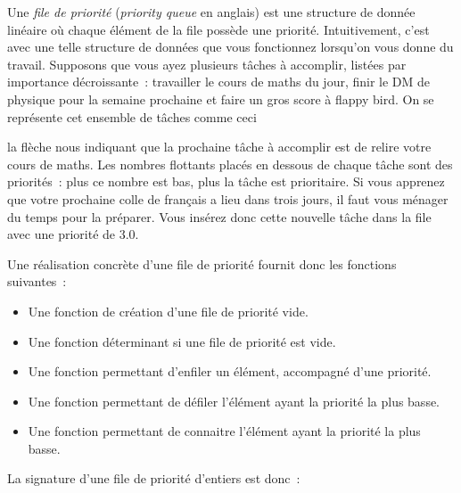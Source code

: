 \documentclass{magnolia}
\begin{document}
Une \emph{file de priorité} (\emph{priority queue} en anglais) est une structure de donnée linéaire où chaque élément de la file possède une priorité. Intuitivement, c'est avec une
telle structure de données que vous fonctionnez lorsqu'on vous donne du travail. 
Supposons que vous ayez plusieurs tâches à accomplir, listées par importance décroissante~:
travailler le cours de maths du jour, finir le DM de physique pour la
semaine prochaine et faire un gros score à flappy bird. On se représente cet ensemble de
tâches comme ceci
\begin{center}
\end{center}

\noindent
la flèche nous indiquant que la prochaine tâche à accomplir est de relire votre cours de
maths. Les nombres flottants placés en dessous de chaque tâche sont des priorités~: plus ce nombre
est bas, plus la tâche est prioritaire. Si vous apprenez que votre prochaine colle de
français a lieu dans trois jours, il faut vous ménager du temps
pour la préparer. Vous insérez donc cette nouvelle tâche dans la file avec une
priorité de $3.0$.  

\begin{center}
\end{center}
Une réalisation concrète d'une file de priorité fournit donc les
fonctions suivantes~:
\begin{itemize}
\item Une fonction de création d'une file de priorité vide.
\item Une fonction déterminant si une file de priorité est vide.
\item Une fonction permettant d'enfiler un élément, accompagné d'une priorité.
\item Une fonction permettant de défiler l'élément ayant la priorité la plus basse.
\item Une fonction permettant de connaitre l'élément ayant la priorité la plus basse.
\end{itemize}
La signature d'une file de priorité d'entiers est donc~:
\end{document}
